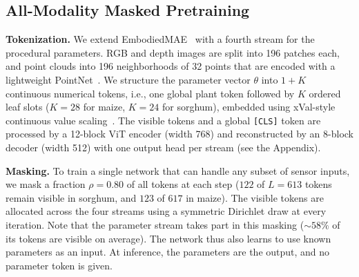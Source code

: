 \documentclass[10pt,twocolumn,letterpaper]{article}
\newcommand{\appendixref}[1]{\hyperref[#1]{Appendix~\ref*{#1}}}
\begin{document}
\subsection{All-Modality Masked Pretraining}
\label{sec:method-pretrain}

\noindent\textbf{Tokenization.}
We extend EmbodiedMAE~\citep{dong2025embodiedmae} with a fourth stream for the procedural parameters. RGB and depth images are split into 196 patches each, and point clouds into 196 neighborhoods of 32 points that are encoded with a lightweight PointNet~\citep{pang2022pointmae,qi2017pointnet}. We structure the parameter vector $\theta$ into $1 + K$ continuous numerical tokens, i.e., one global plant token followed by $K$ ordered leaf slots ($K = 28$ for maize, $K = 24$ for sorghum), embedded using xVal-style continuous value scaling~\citep{golkar2023xval}. The visible tokens and a global \texttt{[CLS]} token are processed by a 12-block ViT encoder (width 768) and reconstructed by an 8-block decoder (width 512) with one output head per stream (see the Appendix).

\noindent\textbf{Masking.}
To train a single network that can handle any subset of sensor inputs, we mask a fraction $\rho = 0.80$ of all tokens at each step ($122$ of $L = 613$ tokens remain visible in sorghum, and $123$ of $617$ in maize). The visible tokens are allocated across the four streams using a symmetric Dirichlet draw at every iteration. Note that the parameter stream takes part in this masking ($\sim 58\%$ of its tokens are visible on average). The network thus also learns to use known parameters as an input. At inference, the parameters are the output, and no parameter token is given. %
\end{document}
